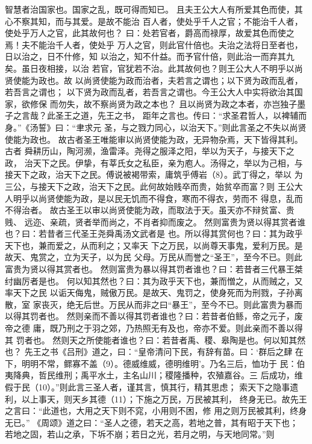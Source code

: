 \documentclass[12pt,UTF8]{ctexbook}
\begin{document}
智慧者治国家也。国家之乱，既可得而知已。 
且夫王公大人有所爱其色而使，其心不察其知，而与其爱。是故不能治 
百人者，使处乎千人之官；不能治千人者，使处乎万人之官，此其故何也？ 
曰：处若官者，爵高而禄厚，故爱其色而使之焉！夫不能治千人者，使处乎 
万人之官，则此官什倍也。夫治之法将日至者也，日以治之，日不什修，知 
以治之，知不什益。而予官什倍，则此治一而弃其九矣。虽日夜相接，以治 
若官，官犹若不治。此其故何也？则王公大人不明乎以尚贤使能为政也。故 
以尚贤使能为政而治者，夫若言之谓也；以下贤为政而乱者，若吾言之谓也； 
以下贤为政而乱者，若吾言之谓也。今王公大人中实将欲治其国家，欲修保 
而勿失，故不察尚贤为政之本也？ 
且以尚贤为政之本者，亦岂独子墨子之言哉？此圣王之道，先王之书， 
距年之言也。传曰：“求圣君哲人，以裨辅而身。”《汤誓》曰：“聿求元 
圣，与之戮力同心，以治天下。”则此言圣之不失以尚贤使能为政也。 
故古者圣王唯能审以尚贤使能为政，无异物杂焉，天下皆得其利。古者 
舜耕历山，陶河濒，渔雷泽。尧得之服泽之阳，举以为天子，与接天下之政， 
治天下之民。伊挚，有莘氏女之私臣，亲为庖人。汤得之，举以为己相，与 
接天下之政，治天下之民。傅说被褐带索，庸筑乎傅岩（8）。武丁得之，举以 
为三公，与接天下之政，治天下之民。此何故始贱卒而贵，始贫卒而富？则 
王公大人明乎以尚贤使能为政，是以民无饥而不得食，寒而不得衣，劳而不 
得息，乱而不得治者。 
故古圣王以审以尚贤使能为政，而取法于天。虽天亦不辩贫富、贵贱、 
远迩、亲疏，贤者举而尚之，不肖者抑而废之。 
然则富贵为贤以得其赏者谁也？曰：若昔者三代圣王尧舜禹汤文武者是 
也。所以得其赏何也？曰：其为政乎天下也，兼而爱之，从而利之；又率天 
下之万民，以尚尊天事鬼，爱利万民。是故天、鬼赏之，立为天子，以为民 
父母。万民从而誉之“圣王”，至今不已。则此富贵为贤以得其赏者也。 
然则富贵为暴以得其罚者谁也？曰：若昔者三代暴王桀纣幽厉者是也。 
何以知其然也？曰：其为政乎天下也，兼而憎之，从而贼之，又率天下之民 
以诟天侮鬼，贼傲万民。是故天、鬼罚之，使身死而为刑戮，子孙离散，室 
家丧灭，绝无后世。万民从而非之曰“暴王”，至今不已。则此富贵为暴而 
以得其罚者也。 
然则亲而不善以得其罚者谁也？曰：若昔者伯鲧，帝之元子，废帝之德 
庸，既乃刑之于羽之郊，乃热照无有及也，帝亦不爱。则此亲而不善以得其 
罚者也。 
然则天之所使能者谁也？曰：若昔者禹、稷、皋陶是也。何以知其然也？ 
先王之书《吕刑》道之，曰：“皇帝清问下民，有辞有苗。曰：‘群后之肆 
在下，明明不常，鳏寡不盖（9）。德威维威，德明维明’。乃名三后，恤功于 
民：伯夷降典，哲民维刑；禹平水土，主名山川；稷隆播种，农殖嘉谷。三 
后成功，维假于民（10）。”则此言三圣人者，谨其言，慎其行，精其思虑； 
索天下之隐事遗利，以上事天，则天乡其德（11）；下施之万民，万民被其利， 
终身无已。故先王之言曰：“此道也，大用之天下则不窕，小用则不困，修 
用之则万民被其利，终身无已。” 
《周颂》道之曰：“圣人之德，若天之高，若地之普，其有昭于天下也； 
若地之固，若山之承，下坼不崩；若日之光，若月之明，与天地同常。”则 
\end{document}
